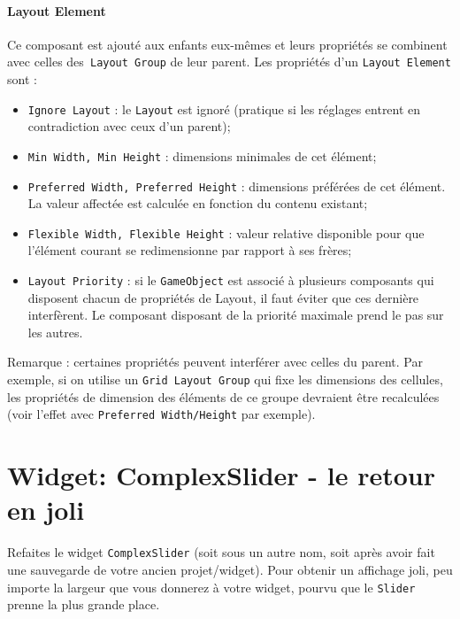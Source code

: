 \documentclass[a4paper,10pt]{article}
\newenvironment{solution}%
{\begin{tcolorbox}[breakable,colback=red!5!white,colframe=red!75!black,title=Solution]}%
{\end{tcolorbox}}
\begin{document}
\begin{enumerate}
	
\ifversionenseignant
\begin{solution}
	\paragraph{Layout Element}
	
Ce composant est ajouté aux enfants eux-mêmes et leurs propriétés se combinent avec celles des\texttt{ Layout Group} de leur parent. Les propriétés d'un \texttt{Layout Element} sont : 
\begin{itemize}
	\item \texttt{Ignore Layout} : le \texttt{Layout} est ignoré (pratique si les réglages entrent en contradiction avec ceux d'un parent);
	\item \texttt{Min Width, Min Height} : dimensions minimales de cet élément;
	\item \texttt{Preferred Width, Preferred Height} : dimensions préférées de cet élément. La valeur affectée est calculée en fonction du contenu existant;
	\item \texttt{Flexible Width, Flexible Height} : valeur relative disponible pour que l'élément courant se redimensionne par rapport à ses frères;
	\item  \texttt{Layout Priority} : si le \texttt{GameObject} est associé à plusieurs composants qui disposent chacun de propriétés de Layout, il faut éviter que ces dernière interfèrent. Le composant disposant de la priorité maximale prend le pas sur les autres.	
\end{itemize}

Remarque : certaines propriétés peuvent interférer avec celles du parent. Par exemple, si on utilise un \texttt{Grid Layout Group} qui fixe les dimensions des cellules, les propriétés de dimension des éléments de ce groupe devraient être recalculées (voir l'effet avec \texttt{Preferred Width/Height} par exemple).	
\end{solution}
\fi 

	
	
\end{enumerate}

\section{Widget: ComplexSlider - le retour en joli}

Refaites le widget \texttt{ComplexSlider} (soit sous un autre nom, soit après avoir fait une sauvegarde de votre ancien projet/widget). Pour obtenir un affichage joli, peu importe la largeur que vous donnerez à votre widget, pourvu que le \texttt{Slider} prenne la plus grande place.
\end{document}
